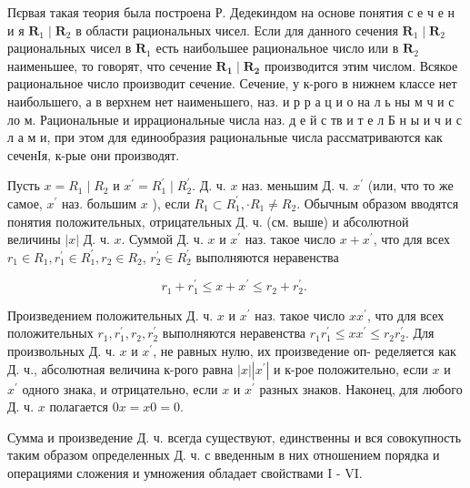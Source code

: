 \documentclass[10pt]{article}
\begin{document}
Пєрвая такая теория была построена Р. Дедекиндом на основе понятия с е ч е н и я $\boldsymbol{R}_{1} \mid \boldsymbol{R}_{2}$ в области рациональных чисел. Если для данного сечения $\boldsymbol{R}_{1} \mid \boldsymbol{R}_{2}$ рациональных чисел в $\boldsymbol{R}_{1}$ есть наибольшее рациональное число или в $\boldsymbol{R}_{2}$ наименьшее, то говорят, что сечение $\boldsymbol{R}_{\mathbf{1}} \mid \boldsymbol{R}_{\mathbf{2}}$ производится этим числом. Всякое рациональное число производит сечение. Сечение, у к-рого в нижнем классе нет наибольшего, а в верхнем нет наименьшего, наз. и р р а ц и о на л ь ны м ч и с ло м. Рациональные и иррациональные числа наз. д е й с тв и т е л Б н ы и ч и с л а м и, при этом для единообразия рациональные числа рассматриваются как сеченІя, к-рые они производят.



Пусть $x=R_{1} \mid R_{2}$ и $x^{\prime}=R_{1}^{\prime} \mid R_{2}^{\prime}$. Д. ч. $x$ наз. меньшим Д. ч. $x^{\prime}$ (или, что то же самое, $x^{\prime}$ наз. большим $x$ ), если $R_{1} \subset R_{1}^{\prime}, \cdot R_{1} \neq R_{2}$. Обычным образом вводятся понятия положительных, отрицательных Д. ч. (см. выше) и абсолютной величины $|x|$ Д. ч. $x$. Суммой Д. ч. $x$ и $x^{\prime}$ наз. такое число $x+x^{\prime}$, что для всех $r_{1} \in R_{1}, r_{1}^{\prime} \in R_{1}^{\prime}, r_{2} \in R_{2}$, $r_{2}^{\prime} \in R_{2}^{\prime}$ выполняются неравенства



\[

r_{1}+r_{1}^{\prime} \leqslant x+x^{\prime} \leqslant r_{2}+r_{2}^{\prime} \text {. }

\]



Произведением положительных Д. ч. $x$ и $x^{\prime}$ наз. такое число $x x^{\prime}$, что для всех положительных $r_{1}, r_{1}^{\prime}, r_{2}, r_{2}^{\prime}$ выполняются неравенства $r_{1} r_{1}^{\prime} \leqslant x x^{\prime} \leqslant r_{2} r_{2}^{\prime}$. Для произвольных Д. ч. $x$ и $x^{\prime}$, не равных нулю, их произведение оп- ределяется как Д. ч., абсолютная величина к-рого равна $|x|\left|x^{\prime}\right|$ и к-рое положительно, если $x$ и $x^{\prime}$ одного знака, и отрицательно, если $x$ и $x^{\prime}$ разных знаков. Наконец, для любого Д. ч. $x$ полагается $0 x=x 0=0$.



Сумма и произведение Д. ч. всегда существуют, единственны и вся совокупность таким образом определенных Д. ч. с введенным в них отношением порядка и операциями сложения и умножения обладает свойствами I - VI.
\end{document}
